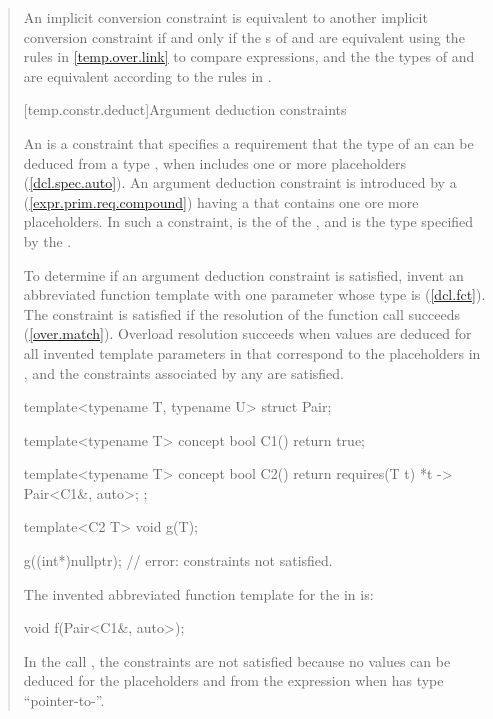 \begin{quote}
\pnum
An implicit conversion constraint  is equivalent to another implicit 
conversion constraint  if and only if the s 
of  and  are equivalent using the rules in
\ref{temp.over.link} to compare expressions, and the the types
of  and  are equivalent according to the rules in
.


[temp.constr.deduct]{Argument deduction constraints}

\pnum
An  is a constraint that specifies 
a requirement that the type of an  
can be deduced from a type , when  includes one or more 
placeholders (\ref{dcl.spec.auto}).
% 
\enternote
An argument deduction constraint is introduced by a
 (\ref{expr.prim.req.compound}) having a
 that contains one ore more placeholders.
% 
In such a constraint,  is the  of the 
, and  is the type specified
by the .
\exitnote

\pnum
To determine if an argument deduction constraint is satisfied, invent
an abbreviated function template  with one parameter whose
type is  (\ref{dcl.fct}). 
% 
The constraint is satisfied if the resolution of the function call 
 succeeds (\ref{over.match}).
% 
\enternote
Overload resolution succeeds when values are deduced for all invented
template parameters in  that correspond to the placeholders in 
, and the constraints associated by any 
 are satisfied.
\exitnote
% 
\enterexample
\begin{codeblock}
template<typename T, typename U> struct Pair;

template<typename T>
  concept bool C1() { return true; }

template<typename T>
  concept bool C2() { return requires(T t) { {*t} -> Pair<C1&, auto>; }; }

template<C2 T> void g(T);

g((int*)nullptr); // error: constraints not satisfied.
\end{codeblock}
The invented abbreviated function template  for the 
 in  is:
\begin{codeblock}
void f(Pair<C1&, auto>);
\end{codeblock}
In the call , the constraints are not satisfied 
because no values can be deduced for the placeholders  and 
 from the expression  when  has type
``pointer-to-''.
\exitexample


\end{quote}
